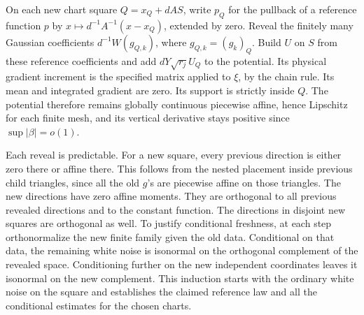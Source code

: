 \documentclass[11pt]{article}
\newcommand{\1}{\mathbf{1}}
\numberwithin{equation}{section}
\begin{document}
On each new chart square \(Q=x_Q+dAS\), write \(p_Q\) for
the pullback of a reference function \(p\) by
\(x\mapsto d^{-1}A^{-1}(x-x_Q)\), extended by zero.
Reveal the finitely many Gaussian coefficients
\(d^{-1}W(g_{Q,k})\), where \(g_{Q,k}=(g_k)_Q\).
Build \(U\) on \(S\) from these reference coefficients and
add \(dY\sqrt{r_j}U_Q\) to the potential. Its physical
gradient increment is the specified matrix applied to
\(\xi\), by the chain rule. Its mean and integrated
gradient are zero. Its support is strictly inside \(Q\).
The potential therefore remains globally continuous
piecewise affine, hence Lipschitz for each finite mesh,
and its vertical derivative stays positive since
\(\sup|\beta|=o(1)\).

Each reveal is predictable. For a new square, every
previous direction is either zero there or affine there.
This follows from the nested placement inside previous
child triangles, since all the old \(g\)'s are piecewise
affine on those triangles. The new directions have zero
affine moments. They are orthogonal to all previous
revealed directions and to the constant function.
The directions in disjoint new squares are orthogonal
as well. To justify conditional freshness, at each
step orthonormalize the new finite family given the
old data. Conditional on that data, the remaining white
noise is isonormal on the orthogonal complement of the
revealed space. Conditioning further on the new independent
coordinates leaves it isonormal on the new complement.
This induction starts with the ordinary white noise on
the square and establishes the claimed reference law
and all the conditional estimates for the chosen charts.
\end{document}
